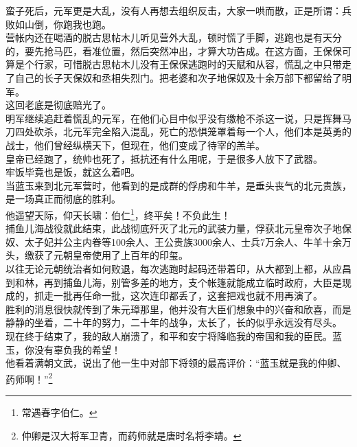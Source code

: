 \begin{multicols}{\theparacolNo}
蛮子死后，元军更是大乱，没有人再想去组织反击，大家一哄而散，正是所谓：兵败如山倒，你跑我也跑。\\

营帐内还在喝酒的脱古思帖木儿听见营外大乱，顿时慌了手脚，逃跑也是有天分的，要先抢马匹，看准位置，然后突然冲出，才算大功告成。在这方面，王保保可算是个行家，可惜脱古思帖木儿没有王保保逃跑时的天赋和从容，慌乱之中只带走了自己的长子天保奴和丞相失烈门。把老婆和次子地保奴及十余万部下都留给了明军。\\

这回老底是彻底赔光了。\\

明军继续追赶着慌乱的元军，在他们心目中似乎没有缴枪不杀这一说，只是挥舞马刀四处砍杀，北元军完全陷入混乱，死亡的恐惧笼罩着每一个人，他们本是英勇的战士，他们曾经纵横天下，但现在，他们变成了待宰的羔羊。\\

皇帝已经跑了，统帅也死了，抵抗还有什么用呢，于是很多人放下了武器。\\

牢饭毕竟也是饭，就这么着吧。\\

当蓝玉来到北元军营时，他看到的是成群的俘虏和牛羊，是垂头丧气的北元贵族，是一场真正而彻底的胜利。\\

他遥望天际，仰天长啸：伯仁\footnote{常遇春字伯仁。}，终平矣！不负此生！\\

捕鱼儿海战役就此结束，此战彻底歼灭了北元的武装力量，俘获北元皇帝次子地保奴、太子妃并公主内眷等100余人、王公贵族3000余人、士兵7万余人、牛羊十余万头，缴获了元朝皇帝使用了上百年的印玺。\\

以往无论元朝统治者如何败退，每次逃跑时起码还带着印，从大都到上都，从应昌到和林，再到捕鱼儿海，别管多差的地方，支个帐篷就能成立临时政府，大臣是现成的，抓走一批再任命一批，这次连印都丢了，这套把戏也就不用再演了。\\

胜利的消息很快就传到了朱元璋那里，他并没有大臣们想象中的兴奋和欣喜，而是静静的坐着，二十年的努力，二十年的战争，太长了，长的似乎永远没有尽头。\\

现在终于结束了，我的敌人崩溃了，和平和安宁将降临我的帝国和我的臣民。蓝玉，你没有辜负我的希望！\\

他看着满朝文武，说出了他一生中对部下将领的最高评价：“蓝玉就是我的仲卿、药师啊！”\footnote{仲卿是汉大将军卫青，而药师就是唐时名将李靖。}\\


\end{multicols}
